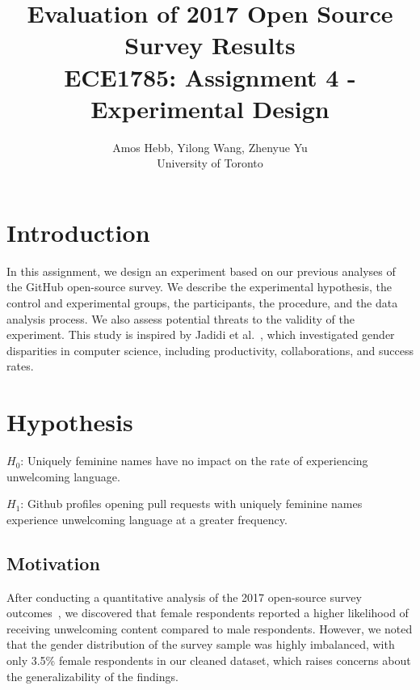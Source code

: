 \documentclass[journal,12pt,onecolumn,]{IEEEtran}
\begin{document}
\title{Evaluation of 2017 Open Source Survey Results \\
{\normalsize ECE1785: Assignment 4 - Experimental Design}}

\author{Amos Hebb, Yilong Wang, Zhenyue Yu\\ \small University of Toronto}

\maketitle

\section{Introduction}

In this assignment, we design an experiment based on our previous analyses of the GitHub open-source survey. We describe the experimental hypothesis, the control and experimental groups, the participants, the procedure, and the data analysis process. 
We also assess potential threats to the validity of the experiment. This study is inspired by Jadidi et al.~\cite{jadidi2018gender}, which investigated gender disparities in computer science, including productivity, collaborations, and success rates.


\section{Hypothesis}

$H_0$: Uniquely feminine names have no impact on the rate of experiencing unwelcoming language.

$H_1$: Github profiles opening pull requests with uniquely feminine names experience unwelcoming language at a greater frequency.


\subsection{Motivation}

After conducting a quantitative analysis of the 2017 open-source survey outcomes~\cite{gitHubOpenSourceSurvey}, we discovered that female respondents reported a higher likelihood of receiving unwelcoming content compared to male respondents. However, we noted that the gender distribution of the survey sample was highly imbalanced, with only 3.5\% female respondents in our cleaned dataset, which raises concerns about the generalizability of the findings.
\end{document}
